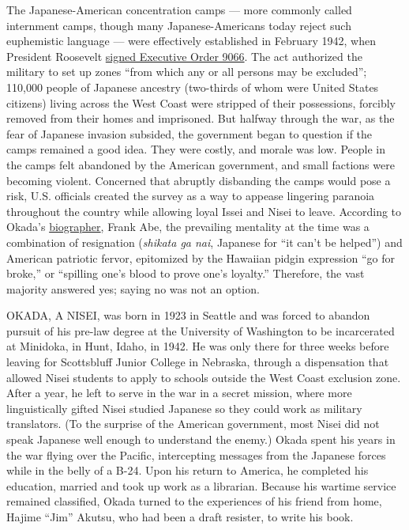 The Japanese-American concentration camps --- more commonly called
internment camps, though many Japanese-Americans today reject such
euphemistic language --- were effectively established in February 1942,
when President Roosevelt
\href{https://www.nytimes3xbfgragh.onion/2015/11/27/us/from-pearl-harbor-to-an-apology-an-internment-timeline.html}{signed
Executive Order 9066}. The act authorized the military to set up zones
``from which any or all persons may be excluded''; 110,000 people of
Japanese ancestry (two-thirds of whom were United States citizens)
living across the West Coast were stripped of their possessions,
forcibly removed from their homes and imprisoned. But halfway through
the war, as the fear of Japanese invasion subsided, the government began
to question if the camps remained a good idea. They were costly, and
morale was low. People in the camps felt abandoned by the American
government, and small factions were becoming violent. Concerned that
abruptly disbanding the camps would pose a risk, U.S. officials created
the survey as a way to appease lingering paranoia throughout the country
while allowing loyal Issei and Nisei to leave. According to Okada's
\href{https://uwapress.uw.edu/book/9780295743516/john-okada/}{biographer},
Frank Abe, the prevailing mentality at the time was a combination of
resignation (\emph{shikata ga nai}, Japanese for ``it can't be helped'')
and American patriotic fervor, epitomized by the Hawaiian pidgin
expression ``go for broke,'' or ``spilling one's blood to prove one's
loyalty.'' Therefore, the vast majority answered yes; saying no was not
an option.

OKADA, A NISEI, was born in 1923 in Seattle and was forced to abandon
pursuit of his pre-law degree at the University of Washington to be
incarcerated at Minidoka, in Hunt, Idaho, in 1942. He was only there for
three weeks before leaving for Scottsbluff Junior College in Nebraska,
through a dispensation that allowed Nisei students to apply to schools
outside the West Coast exclusion zone. After a year, he left to serve in
the war in a secret mission, where more linguistically gifted Nisei
studied Japanese so they could work as military translators. (To the
surprise of the American government, most Nisei did not speak Japanese
well enough to understand the enemy.) Okada spent his years in the war
flying over the Pacific, intercepting messages from the Japanese forces
while in the belly of a B-24. Upon his return to America, he completed
his education, married and took up work as a librarian. Because his
wartime service remained classified, Okada turned to the experiences of
his friend from home, Hajime ``Jim'' Akutsu, who had been a draft
resister, to write his book.

